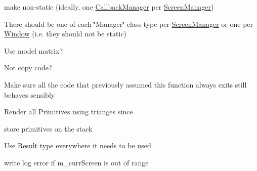 \begin{DoxyRefList}
make non-\/static (ideally, one \hyperlink{classnta_1_1CallbackManager}{Callback\+Manager} per \hyperlink{classnta_1_1ScreenManager}{Screen\+Manager})  
\item[\label{todo__todo000003}%
\Hypertarget{todo__todo000003}%
Class \hyperlink{classnta_1_1ErrorManager}{nta\+:\+:Error\+Manager} ]There should be one of each \char`\"{}\+Manager\char`\"{} class type per \hyperlink{classnta_1_1ScreenManager}{Screen\+Manager} or one per \hyperlink{classnta_1_1Window}{Window} (i.\+e. they should not be static)  
\item[\label{todo__todo000012}%
\Hypertarget{todo__todo000012}%
Member \hyperlink{structnta_1_1Glyph_a3b2afa4370140736d9d1b28de20d2105}{nta\+:\+:Glyph\+:\+:Glyph} (crvec4 pos\+Rect, crvec4 uv\+Rect, G\+Luint tex, float d, crvec4 col, float angle)]Use model matrix?  
\item[\label{todo__todo000015}%
\Hypertarget{todo__todo000015}%
Member \hyperlink{classnta_1_1IOManager_abbfd9da05b22aa488043a19344d38e0a}{nta\+:\+:I\+O\+Manager\+:\+:read\+File\+To\+Buffer} (crstring file\+Path, std\+::string \&buffer)]Not copy code?  
\item[\label{todo__todo000024}%
\Hypertarget{todo__todo000024}%
Member \hyperlink{classnta_1_1Logger_a22e0cfbb0e04de2c377cdd5297c39eee}{nta\+:\+:Logger\+:\+:write\+Error\+To\+Log} (crstring error, Error\+Type type=O\+T\+H\+ER)]Make sure all the code that previously assumed this function always exits still behaves sensibly  
\item[\label{todo__todo000026}%
\Hypertarget{todo__todo000026}%
Member \hyperlink{classnta_1_1PrimitiveBatch_a8b1bcf740a16d65a79566c0a9aebd117}{nta\+:\+:Primitive\+Batch\+:\+:create\+Render\+Batches} ()]Render all Primitives using trianges since  
\item[\label{todo__todo000009}%
\Hypertarget{todo__todo000009}%
Member \hyperlink{classnta_1_1PrimitiveBatch_a85b1ab0111c7d02d5899f47fe1946c4f}{nta\+:\+:Primitive\+Batch\+:\+:m\+\_\+primitives} ]store primitives on the stack  
\item[\label{todo__todo000004}%
\Hypertarget{todo__todo000004}%
Class \hyperlink{classnta_1_1Result}{nta\+:\+:Result$<$ T $>$} ]Use \hyperlink{classnta_1_1Result}{Result} type everywhere it needs to be used  
\item[\label{todo__todo000027}%
\Hypertarget{todo__todo000027}%
Member \hyperlink{classnta_1_1ScreenManager_a4b26e8adc481bfb37a088e047e4ccc2a}{nta\+:\+:Screen\+Manager\+:\+:get\+Curr\+Screen} () const]write log error if m\+\_\+curr\+Screen is out of range  

\end{DoxyRefList}
